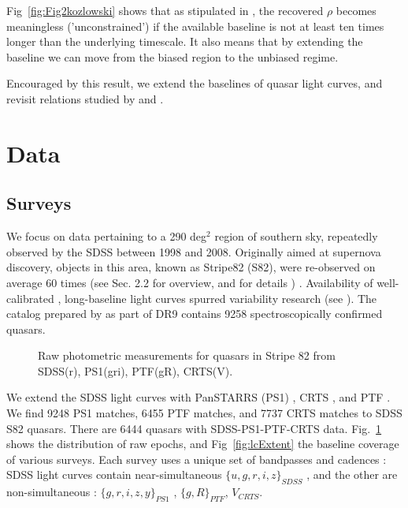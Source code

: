 \documentclass[twocolumn]{aastex62}
\begin{document}
Fig~\ref{fig:Fig2kozlowski} shows that as stipulated in \cite{kozlowski2017a},  the recovered $\rho$ becomes meaningless ('unconstrained') if the available baseline is not at least ten times longer than the underlying timescale. It also means that by extending the baseline we can move from the biased region to the unbiased regime. 

Encouraged by this result, we extend the baselines of  quasar light curves, and revisit relations studied by  \cite{macleod2011} and \cite{hernitschek2016}. 

\section{Data}
\subsection{Surveys}
We focus on data pertaining to a 290 deg$^{2}$ region of southern sky, repeatedly observed by the SDSS between 1998 and 2008. Originally aimed at supernova discovery, objects in this area, known as Stripe82 (S82), were  re-observed on average 60 times (see \citealt{macleod2012} Sec. 2.2 for overview, and \citealt{annis2014} for details ) . Availability of well-calibrated \citep{ivezic2007}, long-baseline light curves spurred variability research (see \citealt{sesar2007}). The catalog prepared by \citep{schneider2008} as part of DR9  contains 9258 spectroscopically confirmed quasars.  

\begin{figure}%
\caption{Raw photometric measurements for quasars in Stripe 82 from SDSS(r),  PS1(gri),  PTF(gR), CRTS(V).}
\label{fig:rawBaselines}
\end{figure} 

\begin{figure*}
\caption{The contribution to quasars light curve baseline from surveys, including the planned LSST coverage. Vertical offset is arbitrary. Note how PS1 and PTF extend the baseline of SDSS by approximately $50\%$, and how inclusion of LSST triples the SDSS baseline. }
\label{fig:lcExtent}
\end{figure*} 


We extend the SDSS  light curves with PanSTARRS (PS1) \citep{chambers2011,flewelling2018}, CRTS \citep{drake2009}, and PTF \citep{rau2009}. We find 9248 PS1 matches, 6455 PTF matches, and 7737 CRTS matches to SDSS S82 quasars. There are  6444 quasars with SDSS-PS1-PTF-CRTS data.  Fig.~\ref{fig:rawBaselines}  shows the distribution of raw epochs, and Fig~\ref{fig:lcExtent} the  baseline coverage of various surveys.    Each survey uses a unique set of bandpasses and cadences : SDSS light curves contain near-simultaneous $\{u,g,r,i,z\}_{SDSS}$ , and the other are  non-simultaneous : $\{g,r,i,z,y\}_{PS1}$ ,  $\{g,R\}_{PTF}$, $V_{CRTS}$.  
\end{document}
